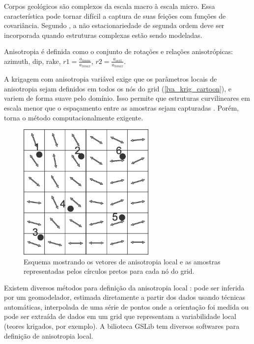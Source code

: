 Corpos geológicos são complexos da escala macro à escala micro. Essa característica pode tornar difícil a captura de suas feições com funções de covariância. Segundo , a não estacionariedade de segunda ordem deve ser incorporada quando estruturas complexas estão sendo modeladas.

Anisotropia é definida como o conjunto de rotações e relações anisotrópicas: azimuth, dip, rake, $r1 = \frac{a_{hmin}}{a_{hmax}}$, $r2 = \frac{a_{vert}}{a_{hmax}}$. 


A krigagem com anisotropia variável exige que os parâmetros locais de anisotropia sejam definidos em todos os nós do grid (\autoref{lva_krig_cartoon}), e variem de forma suave pelo domínio. Isso permite que estruturas curvilineares em escala menor que o espaçamento entre as amostras sejam capturadas \cite{martin2017implicitmodeling}. Porém, torna o método computacionalmente exigente.

\begin{figure}[H]
\caption{\label{lva_krig_cartoon}Esquema mostrando os vetores de anisotropia local e as amostras representadas pelos círculos pretos para cada nó do grid.}
	\centering
		\includegraphics[width=0.6\textwidth]{capitulo_2/imagens/lvakrig.jpg}
\end{figure}

Existem diversos métodos para definição da anisotropia local \cite{lillah2015inference}: pode ser inferida por um geomodelador, estimada diretamente a partir dos dados usando técnicas automáticas, interpolada de uma série de pontos onde a orientação foi medida ou pode ser extraída de dados em um grid que representam a variabilidade local (teores krigados, por exemplo). A bilioteca GSLib tem diversos softwares para definição de anisotropia local. 

